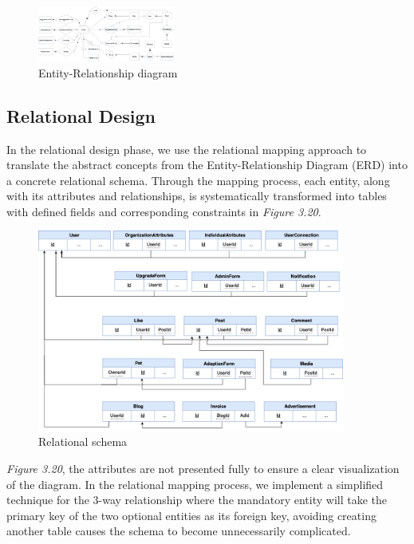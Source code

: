 \begin{figure}[H]
    \centering
    \includegraphics[angle=-90,width=0.4\textwidth]{Figures/DatabaseDesign/Entities-ERD.png}
    \caption{Entity-Relationship diagram}
\end{figure}
\clearpage

\subsection{Relational Design}

In the relational design phase, we use the relational mapping approach
to translate the abstract concepts from the Entity-Relationship Diagram
(ERD) into a concrete relational schema. Through the mapping process,
each entity, along with its attributes and relationships, is
systematically transformed into tables with defined fields and
corresponding constraints in \emph{Figure 3.20}.

\begin {figure}[H]
\centering
\includegraphics[width=0.9\textwidth]{Figures/DatabaseDesign/Entities-Mapping.png}
\caption{Relational schema}
\end{figure}

\emph{Figure 3.20}, the attributes are not presented fully to ensure a clear visualization of the diagram. In the relational mapping process, we implement a simplified technique for the 3-way relationship where the mandatory entity will take the primary key of the two optional entities as its foreign key, avoiding creating another table causes the schema to become unnecessarily complicated.

